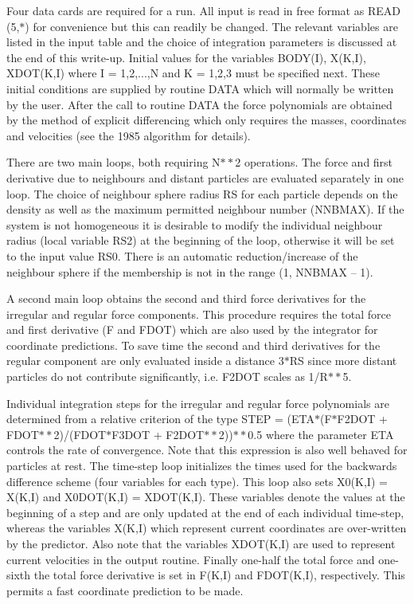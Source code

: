  Four data cards are required for a run.  All input is read in free
 format as READ (5,$\ast$) for convenience but this can readily be
 changed.  The relevant variables are listed
 in the input table and the choice of integration parameters is
 discussed at the end of this write-up.  Initial values for the variables
 BODY(I), X(K,I), XDOT(K,I) where I = 1,2,...,N and K = 1,2,3 must be specified
 next.  These initial conditions are supplied by routine DATA which will
 normally be written by the user.  After the call
     to routine DATA the force polynomials are obtained by the method of
 explicit differencing which only requires the masses, coordinates and
 velocities (see the 1985 algorithm for details).

 There are two main loops, both
 requiring N$\ast\ast$2 operations.  The force and first derivative due to
 neighbours
 and distant particles are evaluated separately in one loop.  The choice of
 neighbour sphere radius RS for each particle depends on the density as well as
 the maximum permitted neighbour number (NNBMAX).  If the system is not
 homogeneous it is desirable to modify the individual neighbour
 radius (local variable RS2) at the beginning of the loop, otherwise it will be
 set to the input value RS0.  There is an automatic
 reduction/increase of the neighbour sphere if the membership is not in the
 range (1, NNBMAX -- 1).

 A second main loop obtains the second and third force derivatives for the
 irregular and regular force components.  This procedure requires the total
 force and first derivative (F and FDOT) which are also used by the integrator
 for
 coordinate predictions.  To save time the second and third derivatives for
 the regular component are only evaluated inside a distance 3$\ast$RS since more
 distant particles do not contribute significantly, i.e. F2DOT scales as
 1/R$\ast\ast$5.

  Individual integration steps for the irregular and regular force polynomials
 are determined from a relative criterion of the type
 STEP = (ETA$\ast$(F$\ast$F2DOT + FDOT$\ast\ast$2)/(FDOT$\ast$F3DOT +
 F2DOT$\ast\ast$2))$\ast\ast$0.5
 where the parameter ETA controls the rate of convergence.  Note that this
 expression is also well behaved for particles at rest.  The time-step loop
 initializes the times used for the backwards difference scheme (four variables
 for each type).  This loop also
 sets X0(K,I) = X(K,I) and X0DOT(K,I) = XDOT(K,I).  These variables denote the
 values at the beginning of a step and are only updated at the end of each
 individual time-step, whereas the variables X(K,I) which represent current
 coordinates are over-written by the predictor.  Also note that the variables
 XDOT(K,I) are used to represent current velocities in the output
 routine.  Finally one-half the total force and one-sixth the total force
 derivative is set in F(K,I) and FDOT(K,I), respectively.  This permits a fast
 coordinate prediction to be made.

